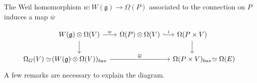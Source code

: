 The Weil homomorphism $w: W(\mathfrak{g}) \to \Omega(P)$ associated to the 
connection on $P$ induces a map $\overline{w}$ 
\begin{comment}
	
\[\begin{tikzcd}[column sep=2.2em]
		&[-34pt] {W(\mathfrak{g})\otimes\Omega(V)} & {\Omega(P\times V)} \\
	{\Omega_G(V)\simeq} &[-34pt] {(W(\mathfrak{g})\otimes\Omega(V))_{bas}} &
			{\Omega(P\times V)_{bas}} &[-34pt] {\simeq\Omega(E)}
				\arrow["w", from=1-2, to=1-3]
					\arrow[from=1-2, to=2-2]
						\arrow[from=1-3, to=2-3]
							\arrow["w", from=2-2, to=2-3]
\end{tikzcd}\]
\end{comment}
\[\begin{tikzcd}[column sep=1em]
		&[-18pt] {W(\mathfrak{g})\otimes\Omega(V)} & {\Omega(P)\otimes\Omega(V)} 
		& {\Omega(P\times V)} \\
	{\Omega_G(V)\simeq} &[-18pt] {(W(\mathfrak{g})\otimes\Omega(V))_{bas}} &&
	{\Omega(P\times V)_{bas}} &[-18pt] {\simeq\Omega(E)}
				\arrow[from=1-2, to=2-2]
					\arrow[from=1-4, to=2-4]
						\arrow["{\overline{w}}", from=2-2, to=2-4]
							\arrow["w", from=1-2, to=1-3]
								\arrow["i",hook, from=1-3, to=1-4]
\end{tikzcd}\]
A few remarks are necessary to explain the diagram.
